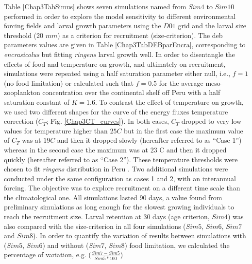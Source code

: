 Table \ref{Chap3TabSimus} shows seven simulations named from $Sim4$ to $Sim10$ performed in order
to explore the model sensitivity to different environmental forcing fields and larval growth
parameters using the $D01$ grid and the larval size threshold (20 $mm$) as a criterion for
recruitment (size-criterion). The \acrshort{deb} parameters values are given in Table \ref{Chap3TabDEBparEncra}, corresponding to \textit{\gls{encrasicolus}} \citep{PethRoos2013} but fitting \textit{\gls{ringens}} larval growth well. In order to disentangle the effects of food and temperature on growth, and ultimately on recruitment, simulations were repeated using a half saturation parameter either null, i.e., $f = 1$ (no food limitation) or calculated such that $f = 0.5$ for the average meso-zooplankton concentration over the continental shelf off Peru with a half saturation constant of $K = 1.6$. To contrast the effect of temperature on growth, we used two different shapes for the curve of the energy fluxes temperature correction ($C_{T}$; Fig. \ref{Chap3CT_curves}). In both cases, $C_{T}$ dropped to very low values for temperature higher than $25$\textdegree $C$ but in the first case the maximum value of $C_{T}$ was at $19$\textdegree $C$ and then it dropped slowly (hereafter referred to as ``Case 1'') whereas in the second case the maximum was at 23 \textdegree C and then it dropped quickly (hereafter referred to as ``Case 2''). These temperature thresholds were chosen to fit \textit{\gls{ringens}} distribution in Peru \citep{CastPena2022}. Two additional simulations were conducted under the same configuration as cases 1 and 2, with an interannual forcing. The objective was to explore recruitment on a different time scale than the climatological one. All simulations lasted 90 days, a value found from preliminary simulations as long enough for the slowest growing individuals to reach the recruitment size. Larval retention at 30 days (age criterion, $Sim 4$) was also compared with the size-criterion in all four simulations ($Sim 5$, $Sim 6$, $Sim 7$ and $Sim 8$). In order to quantify the variation of results between simulations with ($Sim 5$, $Sim 6$) and without ($Sim 7$, $Sim 8$) food limitation, we calculated the percentage of variation, e.g. ($\frac{Sim 7-Sim 5}{Sim 5*100}$)

